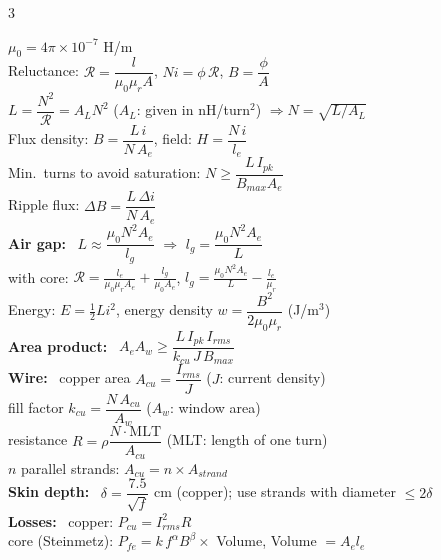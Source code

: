 \documentclass{article}
\newcommand{\hd}[1]{\par\vspace{1.5pt}\fbox{\parbox{\dimexpr\linewidth-2\fboxsep-0.8pt}{\textbf{#1}}}\par\vspace{0.8pt}}
\newcommand{\sh}[1]{\textbf{#1:}\ }
\newcommand{\nt}[1]{#1}
\begin{document}
\begin{multicols*}{3}
\hd{Inductor Design}
$\mu_0=4\pi\times10^{-7}$ H/m\\
Reluctance: $\mathcal R=\dfrac{l}{\mu_0\mu_rA}$, \quad $Ni=\phi\,\mathcal R$, \quad $B=\dfrac{\phi}{A}$\\
$L=\dfrac{N^2}{\mathcal R}=A_LN^2$ \nt{($A_L$: given in nH/turn$^2$)} $\Rightarrow N=\sqrt{L/A_L}$\\
Flux density: $B=\dfrac{L\,i}{N\,A_e}$, \quad field: $H=\dfrac{N\,i}{l_e}$\\
Min.\ turns to avoid saturation: $N\ge\dfrac{L\,I_{pk}}{B_{max}A_e}$\\
Ripple flux: $\Delta B=\dfrac{L\,\Delta i}{N\,A_e}$\\
\sh{Air gap} $L\approx\dfrac{\mu_0N^2A_e}{l_g}$ $\Rightarrow$ $l_g=\dfrac{\mu_0N^2A_e}{L}$\\
with core: $\mathcal R=\frac{l_e}{\mu_0\mu_rA_e}+\frac{l_g}{\mu_0A_e}$, \quad $l_g=\frac{\mu_0N^2A_e}{L}-\frac{l_e}{\mu_r}$\\
Energy: $E=\frac12Li^2$, \quad energy density $w=\dfrac{B^2}{2\mu_0\mu_r}$ (J/m$^3$)\\
\sh{Area product} $A_eA_w\ge\dfrac{L\,I_{pk}\,I_{rms}}{k_{cu}\,J\,B_{max}}$\\
\sh{Wire} copper area $A_{cu}=\dfrac{I_{rms}}{J}$ \nt{($J$: current density)}\\
fill factor $k_{cu}=\dfrac{N\,A_{cu}}{A_w}$ \nt{($A_w$: window area)}\\
resistance $R=\rho\dfrac{N\cdot\text{MLT}}{A_{cu}}$ \nt{(MLT: length of one turn)}\\
$n$ parallel strands: $A_{cu}=n\times A_{strand}$\\
\sh{Skin depth} $\delta=\dfrac{7.5}{\sqrt f}$ cm \nt{(copper)}; use strands with diameter $\le2\delta$\\
\sh{Losses} copper: $P_{cu}=I_{rms}^2R$\\
core (Steinmetz): $P_{fe}=k\,f^{\alpha}B^{\beta}\times$ Volume, \quad Volume $=A_el_e$

\end{multicols*}
\end{document}
